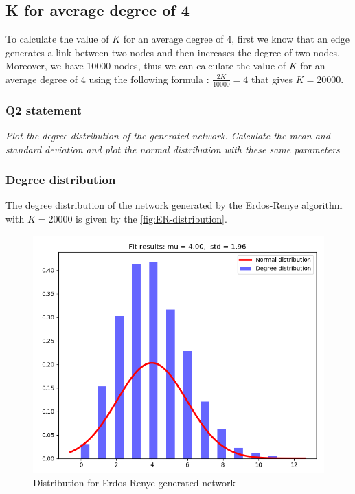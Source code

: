 \documentclass{article}
\begin{document}
\subsection*{K for average degree of 4}

To calculate the value of $K$ for an average degree of 4, first we know that an edge generates a link between two nodes and then increases the degree of two nodes. Moreover, we have 10000 nodes, thus we can calculate the value of $K$ for an average degree of 4 using the following formula : $ \frac{2K}{10000} = 4 $ that gives $K = 20000$. 

\subsubsection{Q2 statement}

\textit{Plot the degree distribution of the generated network. Calculate the mean and standard deviation and plot the normal distribution with these same parameters}

\subsubsection*{Degree distribution} 
The degree distribution of the network generated by the Erdos-Renye algorithm with $K = 20000$ is given by the \autoref{fig:ER-distribution}. 

\begin{figure}[h]
  \centering
  \includegraphics[scale=0.6]{fig/ER-distribution.png}
  \caption{Distribution for Erdos-Renye generated network}
  \label{fig:ER-distribution}
\end{figure}
\end{document}
